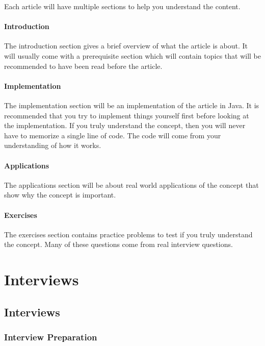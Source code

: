 \documentclass[11pt,oneside]{book}
\begin{document}
Each article will have multiple sections to help you understand the content.

\subsubsection{Introduction}

The introduction section gives a brief overview of what the article is about. It will usually come with a prerequisite section which will contain topics that will be recommended to have been read before the article.

\subsubsection{Implementation}

The implementation section will be an implementation of the article in Java. It is recommended that you try to implement things yourself first before looking at the implementation. If you truly understand the concept, then you will never have to memorize a single line of code. The code will come from your understanding of how it works.

\subsubsection{Applications}

The applications section will be about real world applications of the concept that show why the concept is important.

\subsubsection{Exercises}

The exercises section contains practice problems to test if you truly understand the concept. Many of these questions come from real interview questions.

\chapter{ Interviews }
    \section{ Interviews }
    \subsection{Interview Preparation}
\end{document}
